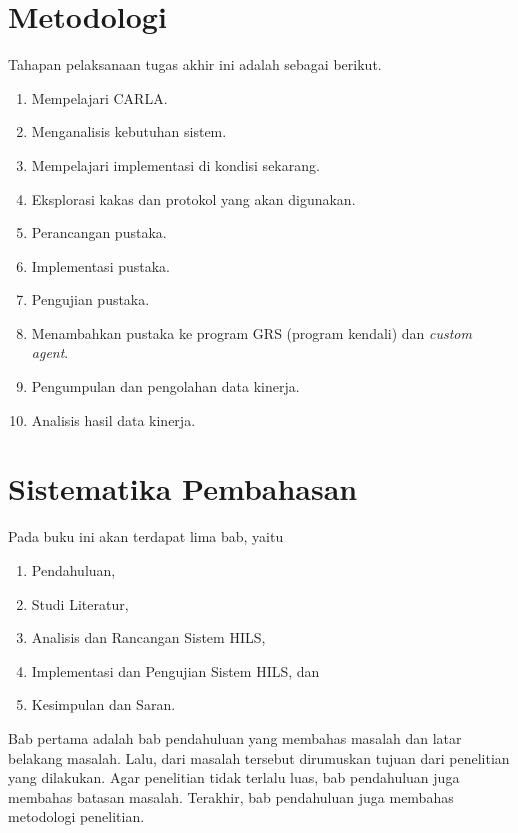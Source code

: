 \section{Metodologi}


Tahapan pelaksanaan tugas akhir ini adalah sebagai berikut.

\begin{enumerate}
	\item Mempelajari CARLA.
	\item Menganalisis kebutuhan sistem.
	\item Mempelajari implementasi di kondisi sekarang.
	\item Eksplorasi kakas dan protokol yang akan digunakan.
	\item Perancangan pustaka.
	\item Implementasi pustaka.
	\item Pengujian pustaka.
	\item Menambahkan pustaka ke program GRS (program kendali) dan
		\textit{custom agent}.
	\item Pengumpulan dan pengolahan data kinerja.
	\item Analisis hasil data kinerja.
\end{enumerate}

\section{Sistematika Pembahasan}


Pada buku ini akan terdapat lima bab, yaitu
\begin{enumerate}
	\item Pendahuluan,
	\item Studi Literatur,
	\item Analisis dan Rancangan Sistem HILS,
	\item Implementasi dan Pengujian Sistem HILS, dan
	\item Kesimpulan dan Saran.
\end{enumerate}

Bab pertama adalah bab pendahuluan yang membahas masalah dan latar belakang
masalah. Lalu, dari masalah tersebut dirumuskan tujuan dari penelitian yang
dilakukan. Agar penelitian tidak terlalu luas, bab pendahuluan juga membahas
batasan masalah. Terakhir, bab pendahuluan juga membahas metodologi penelitian.

